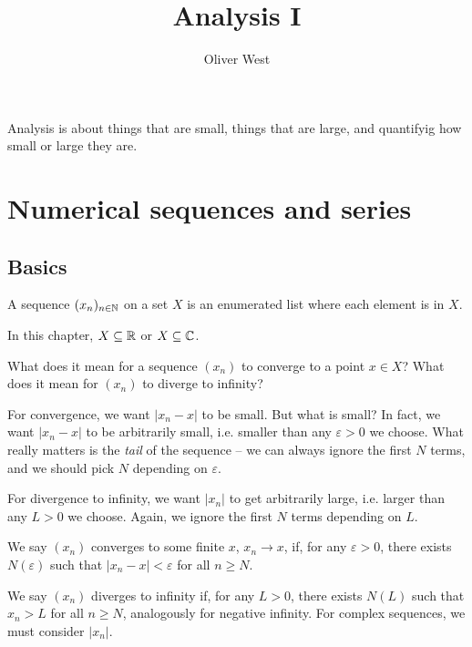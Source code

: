 \documentclass{../template/note}
\author{Oliver West}
\title{Analysis I}
\date{}
\begin{document}
    \maketitle

    \tableofcontents


    Analysis is about things that are small, things that are large, and quantifyig how small or large they are.

    \section{Numerical sequences and series}

    \subsection{Basics}

    \begin{definition}
        A sequence \((x_n)_{n \in \mathbb N}\) on a set \(X\) is an enumerated list where each element is in \(X\).
        
        In this chapter, \(X \subseteq \mathbb R\) or \(X \subseteq \mathbb C\).
    \end{definition}

    What does it mean for a sequence \((x_n)\) to converge to a point \(x \in X\)? What does it mean for \((x_n)\) to diverge to infinity?

    For convergence, we want \(|x_n - x|\) to be small. But what is small? In fact, we want \(|x_n - x|\) to be arbitrarily small, i.e. smaller than any \(\varepsilon > 0\) we choose. What really matters is the \emph{tail} of the sequence -- we can always ignore the first \(N\) terms, and we should pick \(N\) depending on \(\varepsilon\).

    For divergence to infinity, we want \(|x_n|\) to get arbitrarily large, i.e. larger than any \(L > 0\) we choose. Again, we ignore the first \(N\) terms depending on \(L\).
    
    \begin{definition}
        We say \((x_n)\) converges to some finite \(x\), \(x_n \to x\), if, for any \(\varepsilon > 0\), there exists \(N(\varepsilon)\) such that \(|x_n - x| < \varepsilon\) for all \(n \geq N\).

        We say \((x_n)\) diverges to infinity if, for any \(L > 0\), there exists \(N(L)\) such that \(x_n > L\) for all \(n \geq N\), analogously for negative infinity. For complex sequences, we must consider \(|x_n|\).
    \end{definition}
    
\end{document}
